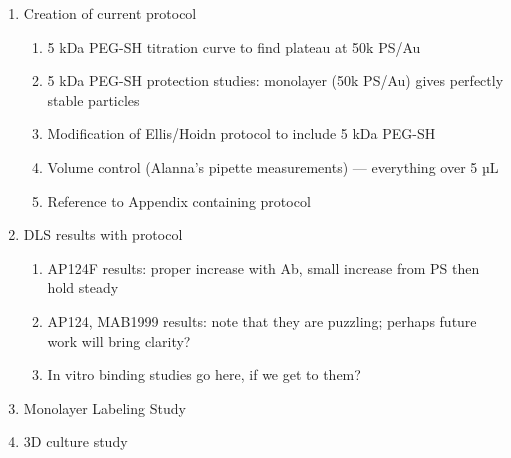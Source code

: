 \begin{enumerate}
\begin{enumerate}
\begin{enumerate}
\begin{enumerate}
\end{enumerate}

\end{enumerate}

\end{enumerate}

\item Creation of current protocol

\begin{enumerate}
\item 5 kDa PEG-SH titration curve to find plateau at 50k PS\slash Au

\item 5 kDa PEG-SH protection studies: monolayer (50k PS\slash Au) gives perfectly stable particles

\item Modification of Ellis\slash Hoidn protocol to include 5 kDa PEG-SH

\item Volume control (Alanna's pipette measurements) --- everything over 5 µL

\item Reference to Appendix containing protocol

\end{enumerate}

\item DLS results with protocol

\begin{enumerate}
\item AP124F results: proper increase with Ab, small increase from PS then hold steady

\item AP124, MAB1999 results: note that they are puzzling; perhaps future work will bring clarity?

\item In vitro binding studies go here, if we get to them?

\end{enumerate}

\item Monolayer Labeling Study

\item 3D culture study

\end{enumerate}
